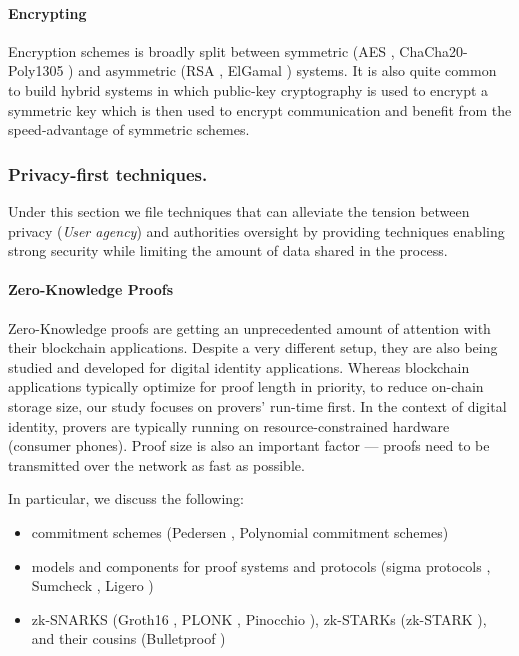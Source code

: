 \paragraph{Encrypting} 
\label{sp:encrypting}
Encryption schemes is broadly split between symmetric (AES \cite{NIST2001AES}, ChaCha20-Poly1305 \cite{RFC7539}) and asymmetric (RSA \cite{RSA78}, ElGamal \cite{E85}) systems. It is also quite common to build hybrid systems in which public-key cryptography is used to encrypt a symmetric key which is then used to encrypt communication and benefit from the speed-advantage of symmetric schemes.

\subsubsection{Privacy-first techniques.} Under this section we file techniques that can alleviate the tension between privacy (\emph{User agency}) and authorities oversight by providing techniques enabling strong security while limiting the amount of data shared in the process.

\paragraph{Zero-Knowledge Proofs} Zero-Knowledge proofs are getting an unprecedented amount of attention with their blockchain applications. 
Despite a very different setup, they are also being studied and developed for digital identity applications.
Whereas blockchain applications typically optimize for proof length in priority, to reduce on-chain storage size, our study focuses on provers' run-time first. In the context of digital identity, provers are typically running on resource-constrained hardware (consumer phones). Proof size is also an important factor --- proofs need to be transmitted over the network as fast as possible.  

In particular, we discuss the following:

\begin{itemize}
    \item commitment schemes (Pedersen \cite{PD91}, Polynomial commitment schemes)
    \item models and components for proof systems and protocols (sigma protocols \cite{SP90}, Sumcheck \cite{LCF92}, Ligero \cite{AHIV22})
    \item zk-SNARKS (Groth16 \cite{G16}, PLONK \cite{GWC90}, Pinocchio \cite{PHGR13}), zk-STARKs (zk-STARK \cite{BCG18}), and their cousins (Bulletproof \cite{BBD18})
\end{itemize}

